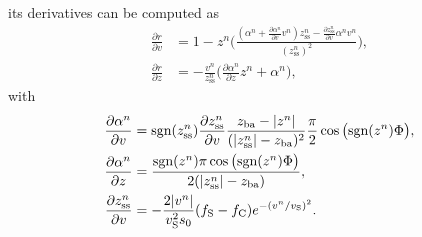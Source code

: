 its derivatives can be computed as
\begin{align*}
    \frac{\partial r}{\partial v} &= 1-z^n\Bigg(\frac{(\alpha^n+\frac{\partial \alpha^n}{\partial v}v^n)z_\text{ss}^n - \frac{\partial z_\text{ss}^n}{\partial v}\alpha^n v^n}{(z_\text{ss}^n)^2}\Bigg),\\
    \frac{\partial r}{\partial z} &= -\frac{v^n}{z_\text{ss}^n}\bigg(\frac{\partial \alpha^n}{\partial z}z^n + \alpha^n\bigg),
    \end{align*}
with
\begin{align*}
    \frac{\partial\alpha^n}{\partial v} &=\text{sgn}(z_\text{ss}^n)\frac{\partial z_\text{ss}^n}{\partial v}\frac{z_\text{ba} - |z^n|}{(|z_\text{ss}^n| - z_\text{ba})^2}\frac{\pi}{2}\cos\big(\text{sgn}(z^n)\Phi\big),\\
    \frac{\partial\alpha^n}{\partial z}&=\frac{\text{sgn}(z^n)\pi\cos\big(\text{sgn}(z^n)\Phi\big)}{2(|z_\text{ss}^n|-z_\text{ba})},\\
    \frac{\partial z_\text{ss}^n}{\partial v} &= -\frac{2|v^n|}{v_\text{S}^2 s_0}(f_\text{S}-f_\text{C})e^{-(v^n/v_\text{S})^2}.
\end{align*}
